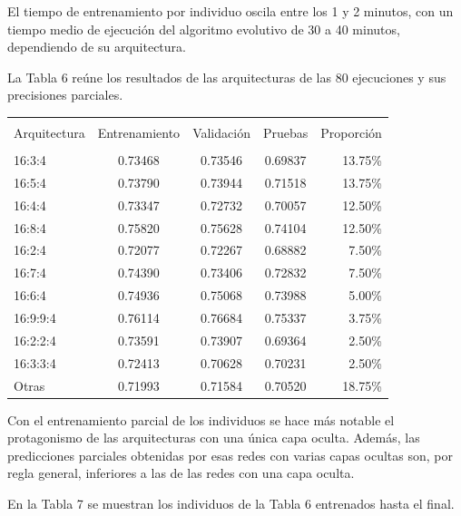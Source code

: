 \documentclass[spanish,a4paper,12pt,twoside]{report}
\begin{document}
  El tiempo de entrenamiento por individuo oscila entre los 1 y 2 minutos, con un tiempo medio de ejecución del algoritmo evolutivo de 30 a 40 minutos, dependiendo de su arquitectura. \par
  La Tabla 6 reúne los resultados de las arquitecturas de las 80 ejecuciones y sus precisiones parciales.
\begin{center}
   \label{table}
  \begin{tabular}{l c c c r}
    \hline \\ [-2ex]
    Arquitectura & Entrenamiento & Validación & Pruebas & Proporción \\ [0.5ex]
    \hline \\ [-1ex]
    16:3:4 & 0.73468 & 0.73546 & 0.69837 & 13.75\% \\
    16:5:4 & 0.73790 & 0.73944 & 0.71518 & 13.75\% \\
    16:4:4 & 0.73347 & 0.72732 & 0.70057 & 12.50\% \\
    16:8:4 & 0.75820 & 0.75628 & 0.74104 & 12.50\% \\
    16:2:4 & 0.72077 & 0.72267 & 0.68882 & 7.50\% \\
    16:7:4 & 0.74390 & 0.73406 & 0.72832 & 7.50\% \\
    16:6:4 & 0.74936 & 0.75068 & 0.73988 & 5.00\% \\
    16:9:9:4 & 0.76114 & 0.76684 & 0.75337 & 3.75\% \\
    16:2:2:4 & 0.73591 & 0.73907 & 0.69364 & 2.50\% \\
    16:3:3:4 & 0.72413 & 0.70628 & 0.70231 & 2.50\%\\ 
    Otras & 0.71993 & 0.71584 & 0.70520 & 18.75\% \\ [1ex]
    \hline
  \end{tabular}
\end{center} \par
  Con el entrenamiento parcial de los individuos se hace más notable el protagonismo de las arquitecturas con una única capa oculta. Además, las predicciones parciales obtenidas por esas redes con varias capas ocultas son, por regla general, inferiores a las de las redes con una capa oculta. \par
  En la Tabla 7 se muestran los individuos de la Tabla 6 entrenados hasta el final.
\end{document}
